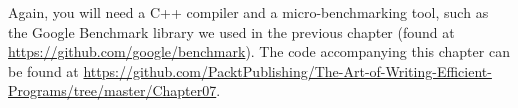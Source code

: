 Again, you will need a C++ compiler and a micro-benchmarking tool, such as the Google Benchmark library we used in the previous chapter (found at \url{https://github.com/google/benchmark}). The code accompanying this chapter can be found at \url{https://github.com/PacktPublishing/The-Art-of-Writing-Efficient-Programs/tree/master/Chapter07}.
